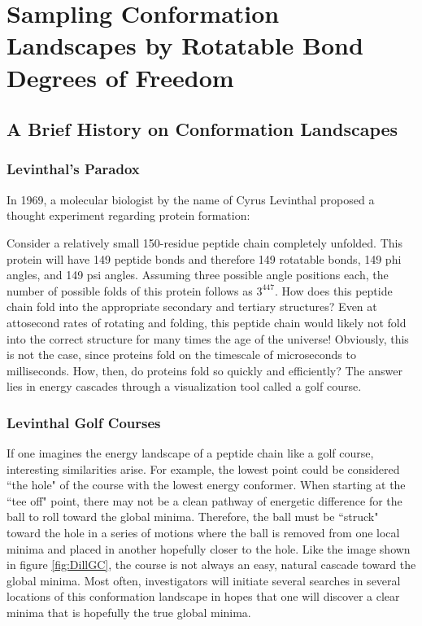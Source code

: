 \chapter{Sampling Conformation Landscapes by Rotatable Bond Degrees of Freedom}
\label{ch:ConformationLandscape}

\section{A Brief History on Conformation Landscapes}

\subsection{Levinthal's Paradox}

In 1969, a molecular biologist by the name of Cyrus Levinthal proposed a thought experiment regarding protein formation\cite{Levinthal}:

Consider a relatively small 150-residue peptide chain completely unfolded.
This protein will have 149 peptide bonds and therefore 149 rotatable bonds, 149 phi angles, and 149 psi angles. 
Assuming three possible angle positions each, the number of possible folds of this protein follows as $3^{447}$.
How does this peptide chain fold into the appropriate secondary and tertiary structures? 
Even at attosecond rates of rotating and folding, this peptide chain would likely not fold into the correct structure for many times the age of the universe!
Obviously, this is not the case, since proteins fold on the timescale of microseconds to milliseconds.\cite{LevParadoxCalculated}
How, then, do proteins fold so quickly and efficiently?
The answer lies in energy cascades through a visualization tool called a golf course.

\subsection{Levinthal Golf Courses}

If one imagines the energy landscape of a peptide chain like a golf course, interesting similarities arise.
For example, the lowest point could be considered ``the hole" of the course with the lowest energy conformer. 
When starting at the ``tee off" point, there may not be a clean pathway of energetic difference for the ball to roll toward the global minima.
Therefore, the ball must be ``struck" toward the hole in a series of motions where the ball is removed from one local minima and placed in another hopefully closer to the hole. 
Like the image shown in figure \ref{fig:DillGC}, the course is not always an easy, natural cascade toward the global minima.
Most often, investigators will initiate several searches in several locations of this conformation landscape in hopes that one will discover a clear minima that is hopefully the true global minima.

